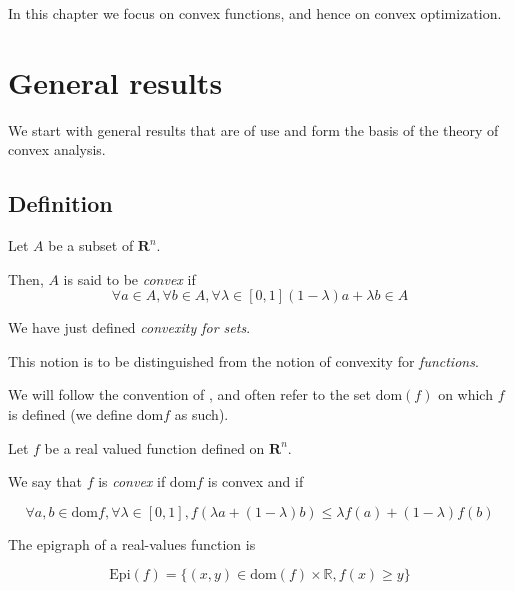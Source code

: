 In this chapter we focus on convex functions, and hence on convex optimization.

\section{General results}

We start with general results that are of use and form the basis of the theory of convex analysis.

\subsection{Definition}

\begin{definition}
    Let $ A $ be a subset of $ \mathbf R^n $.
    
    Then, $ A $ is said to be \textit{convex} if
    \[
        \forall a \in A, \forall b \in A, \forall \lambda \in [0,1] (1-\lambda)a + \lambda b \in A
    \]
\end{definition}

\begin{remark}
    We have just defined \textit{convexity for sets}. 
    
    This notion is to be distinguished from the notion of convexity for \textit{functions}.
\end{remark}

\begin{remark}
    We will follow the convention of \cite{boydvandenberghe2004}, and often refer to the set $ \mathrm{dom}(f) $ on which $ f $ is defined (we define $ \mathrm{dom} f $ as such).
\end{remark}

\begin{definition}
    Let $ f $ be a real valued function defined on $ \mathbf R^n $. 

    We say that $ f $ is \textit{convex} if $ \mathrm{dom} f $ is convex and if

    \[
        \forall a,b \in \mathrm{dom} f, \forall \lambda \in [0,1], f(\lambda a + (1-\lambda)b) \leqslant \lambda f(a) + (1-\lambda) f(b)
    \]
\end{definition}

\begin{definition}[Epigraph]
    The epigraph of a real-values function is

    \[ \mathrm{Epi}(f) = \{ (x,y) \in \mathrm{dom}(f) \times \mathbb R, f(x) \geqslant y \}\]
\end{definition}


